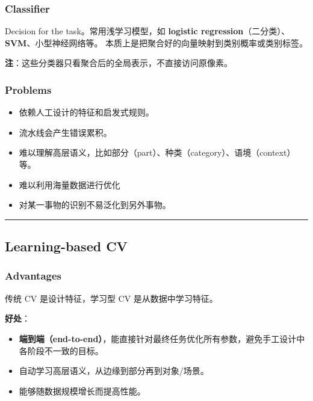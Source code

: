\subsubsection{Classifier}\label{classifier}

Decision for the task。常用浅学习模型，如 \textbf{logistic
  regression}（二分类）、\textbf{SVM}、小型神经网络等。
本质上是把聚合好的向量映射到类别概率或类别标签。

\textbf{注}：这些分类器只看聚合后的全局表示，不直接访问原像素。

\subsubsection{Problems}\label{problems}

\begin{itemize}
  \tightlist
  \item
        依赖人工设计的特征和启发式规则。
  \item
        流水线会产生错误累积。
  \item
        难以理解高层语义，比如部分（part）、种类（category）、语境（context）等。
  \item
        难以利用海量数据进行优化
  \item
        对某一事物的识别不易泛化到另外事物。
\end{itemize}

\begin{center}\rule{0.5\linewidth}{0.5pt}\end{center}

\subsection{Learning-based CV}\label{learning-based-cv}

\subsubsection{Advantages}\label{advantages}

传统 CV 是设计特征，学习型 CV 是从数据中学习特征。

\textbf{好处}：

\begin{itemize}
  \tightlist
  \item
        \textbf{端到端（end-to-end）}，能直接针对最终任务优化所有参数，避免手工设计中各阶段不一致的目标。
  \item
        自动学习高层语义，从边缘到部分再到对象/场景。
  \item
        能够随数据规模增长而提高性能。
\end{itemize}

